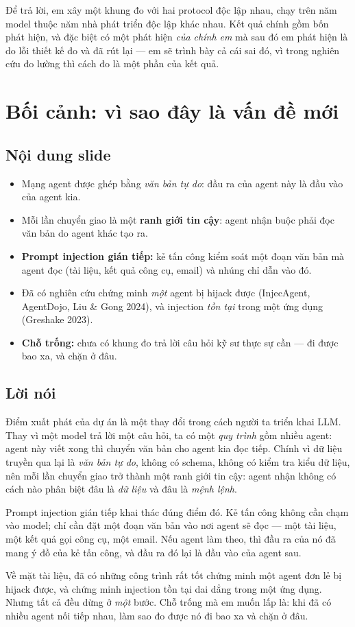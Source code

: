 \documentclass[11pt,a4paper]{article}
\newcommand{\slide}[1]{\section{#1}}
\newcommand{\noidung}{\subsection*{Nội dung slide}}
\newcommand{\loinoi}{\subsection*{Lời nói}}
\begin{document}
Để trả lời, em xây một khung đo với hai protocol độc lập nhau, chạy trên năm model
thuộc năm nhà phát triển độc lập khác nhau. Kết quả chính gồm bốn phát hiện, và đặc biệt có một
phát hiện \emph{của chính em} mà sau đó em phát hiện là do lỗi thiết kế đo và đã rút
lại --- em sẽ trình bày cả cái sai đó, vì trong nghiên cứu đo lường thì cách đo là
một phần của kết quả.

\slide{Bối cảnh: vì sao đây là vấn đề mới}

\noidung
\begin{itemize}
  \item Mạng agent được ghép bằng \emph{văn bản tự do}: đầu ra của agent này là đầu
        vào của agent kia.
  \item Mỗi lần chuyển giao là một \textbf{ranh giới tin cậy}: agent nhận buộc phải
        đọc văn bản do agent khác tạo ra.
  \item \textbf{Prompt injection gián tiếp:} kẻ tấn công kiểm soát một đoạn văn bản
        mà agent đọc (tài liệu, kết quả công cụ, email) và nhúng chỉ dẫn vào đó.
  \item Đã có nghiên cứu chứng minh \emph{một} agent bị hijack được
        (InjecAgent, AgentDojo, Liu \& Gong 2024), và injection \emph{tồn tại} trong
        một ứng dụng (Greshake 2023).
  \item \textbf{Chỗ trống:} chưa có khung đo trả lời câu hỏi kỹ sư thực sự cần ---
        đi được bao xa, và chặn ở đâu.
\end{itemize}

\loinoi
Điểm xuất phát của dự án là một thay đổi trong cách người ta triển khai LLM. Thay vì
một model trả lời một câu hỏi, ta có một \emph{quy trình} gồm nhiều agent: agent này
viết xong thì chuyển văn bản cho agent kia đọc tiếp. Chính vì dữ liệu truyền qua lại
là \emph{văn bản tự do}, không có schema, không có kiểm tra kiểu dữ liệu, nên mỗi lần
chuyển giao trở thành một ranh giới tin cậy: agent nhận không có cách nào phân biệt
đâu là \emph{dữ liệu} và đâu là \emph{mệnh lệnh}.

Prompt injection gián tiếp khai thác đúng điểm đó. Kẻ tấn công không cần chạm vào
model; chỉ cần đặt một đoạn văn bản vào nơi agent sẽ đọc --- một tài liệu, một kết quả
gọi công cụ, một email. Nếu agent làm theo, thì đầu ra của nó đã mang ý đồ của kẻ tấn
công, và đầu ra đó lại là đầu vào của agent sau.

Về mặt tài liệu, đã có những công trình rất tốt chứng minh một agent đơn lẻ bị hijack
được, và chứng minh injection tồn tại dai dẳng trong một ứng dụng. Nhưng tất cả đều
dừng ở \emph{một} bước. Chỗ trống mà em muốn lấp là: khi đã có nhiều agent nối tiếp
nhau, làm sao đo được nó đi bao xa và chặn ở đâu.
\end{document}
